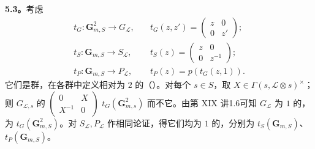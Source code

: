 \textbf{5.3。}考虑
\[\begin{aligned}t_G:\mathbf G_{m,S}^2\to G_{\mathscr L},&\quad t_G(z,z')=\begin{pmatrix}z&0\\0&z'\end{pmatrix};\\t_S:\mathbf G_{m,S}\to S_{\mathscr L},&\quad t_S(z)=\begin{pmatrix}z&0\\0&z^{-1}\end{pmatrix};\\t_P:\mathbf G_{m,S}\to P_{\mathscr L},&\quad t_P(z)=p(t_G(z,1)).\end{aligned}\]
它们是群，在各群中定义相对为 $2$ 的（）。对每个 $s\in S$，取 $X\in\Gamma(s,\mathscr L\otimes s)^\times$；
则 $G_{\mathscr L,s}$ 的 $\left(\begin{smallmatrix}0&X\\X^{-1}&0\end{smallmatrix}\right)$  $t_G(\mathbf G_{m,s}^2)$ 而不它。由第 XIX 讲1.6可知 $G_{\mathscr L}$ 为 $1$ 的，为 $t_G(\mathbf G_{m,S}^2)$。对 $S_{\mathscr L},P_{\mathscr L}$ 作相同论证，得它们均为 $1$ 的，分别为 $t_S(\mathbf G_{m,S})$、$t_P(\mathbf G_{m,S})$。

